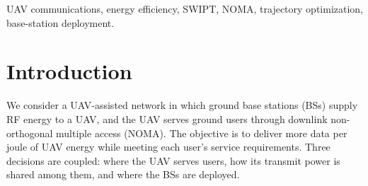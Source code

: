 
\begin{abstract}
This paper studies the joint design of UAV trajectory, NOMA power allocation, and base-station deployment to maximize downlink energy efficiency. A rotary-wing UAV harvests RF energy from multiple base stations and uses it to transmit data to ground users. The UAV flies at a fixed altitude and serves users while hovering at selected waypoints. Energy efficiency is defined as the total delivered bits divided by the UAV energy used for cruising, hovering, and RF transmission. The design must satisfy each user's mission data requirement, minimum service in every slot, an energy budget, and geometric constraints. We formulate the resulting nonconvex problem and consider particle swarm optimization and an improved variant with adaptive mutation to search for feasible solutions. The formulation captures the trade-off between better communication channels and the additional propulsion energy required to reach favorable service locations.
\end{abstract}
\begin{IEEEkeywords}
UAV communications, energy efficiency, SWIPT, NOMA, trajectory optimization, base-station deployment.
\end{IEEEkeywords}

\section{Introduction}
\label{sec:introduction}
We consider a UAV-assisted network in which ground base stations (BSs) supply RF energy to a UAV, and the UAV serves ground users through downlink non-orthogonal multiple access (NOMA). The objective is to deliver more data per joule of UAV energy while meeting each user's service requirements. Three decisions are coupled: where the UAV serves users, how its transmit power is shared among them, and where the BSs are deployed.

